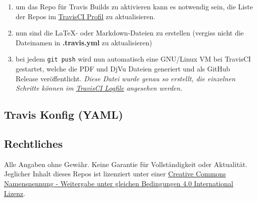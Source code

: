 \documentclass[10pt,a4paper]{article}
\begin{document}
\begin{enumerate}
\item
  um das Repo für Travis Builds zu aktivieren kann es notwendig sein,
  die Liste der Repos im \href{https://travis-ci.org/profile}{TravisCI
  Profil} zu aktualisieren.
\item
  nun sind die \LaTeX- oder Markdown-Dateien zu erstellen (vergiss nicht
  die Dateinamen in \textbf{.travis.yml} zu aktualisieren)
\item
  bei jedem \texttt{git\ push} wird nun automatisch eine GNU/Linux VM
  bei TravisCI gestartet, welche die PDF und DjVu Dateien generiert und
  als GitHub Release veröffentlicht. \emph{Diese Datei wurde genau so
  erstellt, die einzelnen Schritte können im
  \href{https://travis-ci.org/SimonWaldherr/testrepo}{TravisCI Logfile}
  angesehen werden.}
\end{enumerate}

\subsection{Travis Konfig (YAML)}\label{travis-konfig-yaml}



\subsection{Rechtliches}\label{rechtliches}

Alle Angaben ohne Gewähr. Keine Garantie für Vollständigkeit oder
Aktualität. Jeglicher Inhalt dieses Repos ist lizenziert unter einer
\href{http://creativecommons.org/licenses/by-sa/4.0/}{Creative Commons
Namensnennung - Weitergabe unter gleichen Bedingungen 4.0 International
Lizenz}.
\end{document}
